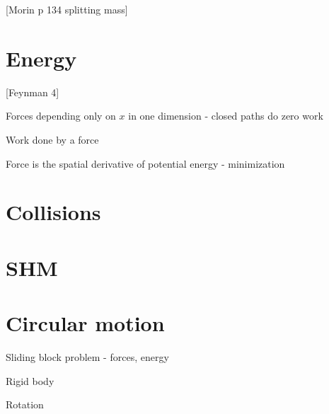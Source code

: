 \documentclass{article}
\newcommand{\<}{\langle}
\renewcommand{\>}{\rangle}
\begin{document}
[Morin p 134 splitting mass]

\section{Energy}

[Feynman 4]

Forces depending only on $x$ in one dimension - closed paths do zero work

Work done by a force

Force is the spatial derivative of potential energy - minimization

\section{Collisions}

\section{SHM}

\section{Circular motion}


Sliding block problem - forces, energy

Rigid body

Rotation
\end{document}
